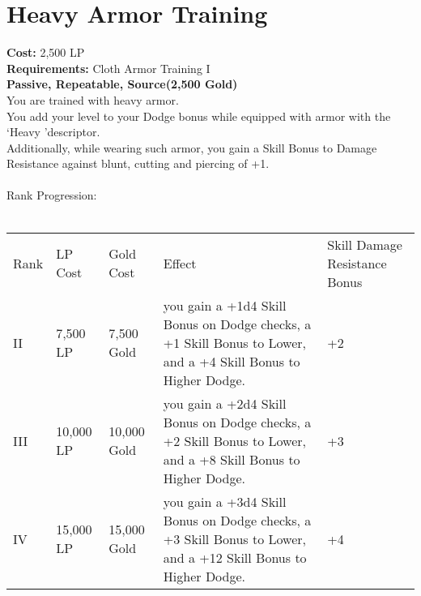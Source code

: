 \section{Heavy Armor Training}\label{perk:heavyArmorTraining}
\textbf{Cost:} 2,500 LP\\
\textbf{Requirements:} Cloth Armor Training I\\
\textbf{Passive, Repeatable, Source(2,500 Gold)}\\
You are trained with heavy armor.\\
You add your level to your Dodge bonus while equipped with armor with the \lq Heavy \rq descriptor.\\
Additionally, while wearing such armor, you gain a Skill Bonus to Damage Resistance against blunt, cutting and piercing of +1.\\
\\

Rank Progression:\\
\\
\begin{longtable}{l | l | l | l | p{9cm}}
    Rank & LP Cost & Gold Cost & Effect & Skill Damage Resistance Bonus \\
    II
    & 7,500 LP
    & 7,500 Gold
    & you gain a +1d4 Skill Bonus on Dodge checks, a +1 Skill Bonus to Lower, and a +4 Skill Bonus to Higher Dodge.
    & +2
    \\
    III
    & 10,000 LP
    & 10,000 Gold
    & you gain a +2d4 Skill Bonus on Dodge checks, a +2 Skill Bonus to Lower, and a +8 Skill Bonus to Higher Dodge.
    & +3
    \\
    IV
    & 15,000 LP
    & 15,000 Gold
    & you gain a +3d4 Skill Bonus on Dodge checks, a +3 Skill Bonus to Lower, and a +12 Skill Bonus to Higher Dodge.
    & +4
    \\
\end{longtable}